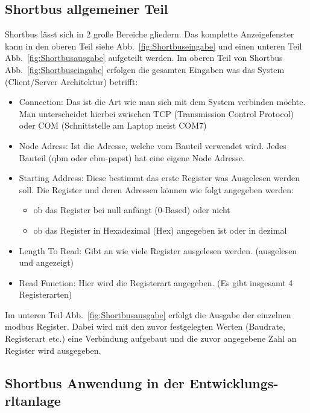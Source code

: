 \subsection{Shortbus allgemeiner Teil}
Shortbus lässt sich in 2 große Bereiche gliedern. Das komplette Anzeigefenster kann in den oberen Teil siehe Abb.~\ref{fig:Shortbuseingabe} und einen unteren Teil Abb.~\ref{fig:Shortbusausgabe} aufgeteilt werden.
Im oberen Teil von Shortbus Abb.~\ref{fig:Shortbuseingabe} erfolgen die gesamten Eingaben was das System (Client/Server Architektur) betrifft:
\begin{itemize}
	\item Connection: Das ist die Art wie man sich mit dem System verbinden möchte. Man unterscheidet hierbei zwischen TCP (Transmission Control Protocol) oder COM (Schnittstelle am Laptop meist COM7)
	
	\item Node Adress: Ist die Adresse, welche vom Bauteil verwendet wird. Jedes Bauteil (\zB \gls{qbm}  oder ebm-papst) hat eine eigene Node Adresse.
	
	\item Starting Address: Diese bestimmt das erste Register was Ausgelesen werden soll. Die Register und deren Adressen können wie folgt angegeben werden:
		\begin{itemize}
			\item ob das Register bei null anfängt (0-Based) oder nicht
			\item ob das Register in Hexadezimal (Hex) angegeben ist oder in dezimal
		\end{itemize}
	\item Length To Read: Gibt an wie viele Register ausgelesen werden. (ausgelesen und angezeigt)
	\item Read Function: Hier wird die Registerart angegeben. (Es gibt insgesamt 4 Registerarten)
\end{itemize}

Im unteren Teil Abb.~\ref{fig:Shortbusausgabe} erfolgt die Ausgabe der einzelnen \gls{modbus} Register. Dabei wird mit den zuvor festgelegten Werten (Baudrate, Registerart etc.) eine Verbindung aufgebaut und die zuvor angegebene Zahl an Register wird ausgegeben. 


  

\subsection{Shortbus Anwendung in der Entwicklungs- \ac{rltanlage}}

